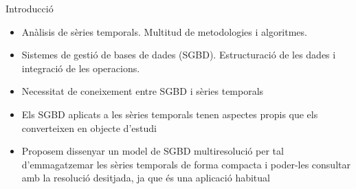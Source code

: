 \begin{frame}{Introducció}

\begin{itemize}

  \item Anàlisis de sèries temporals. Multitud de metodologies i algoritmes.

  \item Sistemes de gestió de bases de dades (SGBD). Estructuració de
    les dades i integració de les operacions.

  \item Necessitat de coneixement entre SGBD i sèries
    temporals \parencite{stonebraker09:scidb,zhang11}

  \item Els SGBD aplicats a les sèries temporals tenen aspectes propis
    que els converteixen en objecte d’estudi

  \item Proposem dissenyar un model de SGBD multiresolució per tal
    d'emmagatzemar les sèries temporals de forma compacta i poder-les
    consultar amb la resolució desitjada, ja que és una aplicació
    habitual

\end{itemize}






\end{frame}






